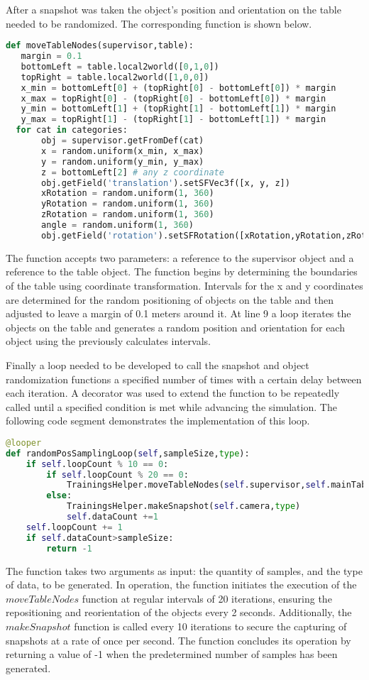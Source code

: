After a snapshot was taken the object's position and orientation on the table needed to be randomized. The corresponding function is shown below.

\begin{lstlisting}[language=python]
def moveTableNodes(supervisor,table):
   margin = 0.1
   bottomLeft = table.local2world([0,1,0])
   topRight = table.local2world([1,0,0])
   x_min = bottomLeft[0] + (topRight[0] - bottomLeft[0]) * margin
   x_max = topRight[0] - (topRight[0] - bottomLeft[0]) * margin
   y_min = bottomLeft[1] + (topRight[1] - bottomLeft[1]) * margin
   y_max = topRight[1] - (topRight[1] - bottomLeft[1]) * margin
  for cat in categories:
       obj = supervisor.getFromDef(cat)
       x = random.uniform(x_min, x_max)
       y = random.uniform(y_min, y_max)
       z = bottomLeft[2] # any z coordinate
       obj.getField('translation').setSFVec3f([x, y, z])
       xRotation = random.uniform(1, 360)
       yRotation = random.uniform(1, 360)
       zRotation = random.uniform(1, 360)
       angle = random.uniform(1, 360)
       obj.getField('rotation').setSFRotation([xRotation,yRotation,zRotation,angle])

\end{lstlisting}
The function accepts two parameters: a reference to the supervisor object and a reference to the table object. The function begins by determining the boundaries of the table using coordinate transformation. Intervals for the x and y coordinates are determined for the random positioning of objects on the table and then adjusted to leave a margin of 0.1 meters around it. At line 9 a loop iterates the objects on the table and generates a random position and orientation for each object using the previously calculates intervals.

Finally a loop needed to be developed to call the snapshot and object randomization functions a specified number of times with a certain delay between each iteration. A decorator was used to extend the function to be repeatedly called until a specified condition is met while advancing the simulation. The following code segment demonstrates the implementation of this loop. 

\begin{lstlisting}[language=python]
@looper
def randomPosSamplingLoop(self,sampleSize,type):
    if self.loopCount % 10 == 0:
        if self.loopCount % 20 == 0:
            TrainingsHelper.moveTableNodes(self.supervisor,self.mainTable)
        else:
            TrainingsHelper.makeSnapshot(self.camera,type)
            self.dataCount +=1
    self.loopCount += 1
    if self.dataCount>sampleSize:
        return -1
\end{lstlisting}
The function takes two arguments as input: the quantity of samples, and the type of data, to be generated. In operation, the function initiates the execution of the \(moveTableNodes\) function at regular intervals of 20 iterations, ensuring the repositioning and reorientation of the objects every 2 seconds. Additionally, the \(makeSnapshot\) function is called every 10 iterations to secure the capturing of snapshots at a rate of once per second. The function concludes its operation by returning a value of -1 when the predetermined number of samples has been generated.

